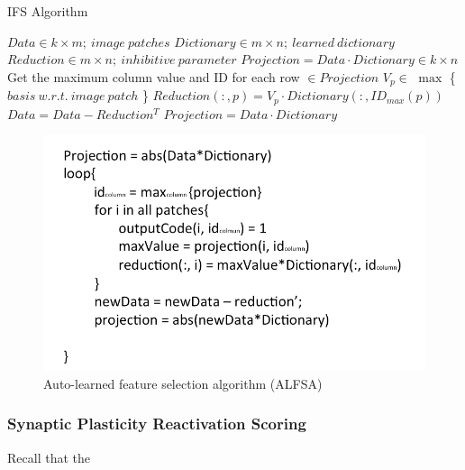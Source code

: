 \documentclass[letterpaper]{article}
\begin{document}
\begin{algorithm}[h]
  \caption{IFS Algorithm}
  \begin{algorithmic}[1]
  	
    \State $Data  \in k \times m;\ image\ patches  $
    \State $Dictionary \in m \times n;\ learned\ dictionary$
   	\State $Reduction \in m\times n;\ inhibitive\ parameter$
    \State $Projection = Data\cdot Dictionary \in k \times n$    
    	\State Get the maximum column value and ID for each row	$\in Projection$
    	 	\State $V_p \in$ $\max$ \{ $basis\ w.r.t.\ image\ patch$ \}
    	 	\State $Reduction(:,p)=V_p\cdot Dictionary( : , ID_{max}(p))$
         \EndFor
         \State $Data=Data - Reduction^T$
         \State $Projection = Data\cdot Dictionary$
    \EndFor 

  \end{algorithmic}
\end{algorithm}

\begin{figure}[!ht]
		\centering
		\includegraphics[width=.4\textwidth]{figures_dir/temp_algorithm1.png}
		\caption{Auto-learned feature selection algorithm (ALFSA)}
		\label{TEMP!!! Inhibitive Feature Selection Algorithm}
\end{figure}

\subsubsection{Synaptic Plasticity Reactivation Scoring}
Recall that the 
\end{document}

